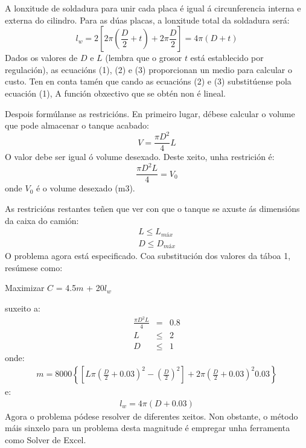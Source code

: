 \documentclass[
  letterpaper,
  DIV=11,
  numbers=noendperiod]{scrartcl}
\begin{document}
A lonxitude de soldadura para unir cada placa é igual á circunferencia
interna e externa do cilindro. Para as dúas placas, a lonxitude total da
soldadura será: \[
l_w = 2 \left [ 2 \pi \left ( \frac {D}{2} + t \right ) + 2 \pi \frac {D}{2} \right ] = 4 \pi (D + t)
\] Dados os valores de \(D\) e \(L\) (lembra que o grosor \(t\) está
establecido por regulación), as ecuacións (1), (2) e (3) proporcionan un
medio para calcular o custo. Ten en conta tamén que cando as ecuacións
(2) e (3) substitúense pola ecuación (1), A función obxectivo que se
obtén non é lineal.

Despois formúlanse as restricións. En primeiro lugar, débese calcular o
volume que pode almacenar o tanque acabado: \[
V = \frac {\pi D^2}{4} L
\] O valor debe ser igual ó volume desexado. Deste xeito, unha
restrición é: \[
\frac {\pi D^2 L}{4} = V_0
\] onde \(V_0\) é o volume desexado (m3).

As restricións restantes teñen que ver con que o tanque se axuste ás
dimensións da caixa do camión: \[
\begin{align*}
L \leq L_{máx} \\
D \leq D_{máx}
\end{align*}
\] O problema agora está especificado. Coa substitución dos valores da
táboa 1, resúmese como:

Maximizar \(C\) = 4.5\(m\) + 20\(l_w\)

suxeito a: \[
\begin{align*}
\frac {\pi D^2 L}{4} & = & 0.8 \\
L & \leq & 2 \\
D & \leq & 1
\end{align*}
\] onde: \[
\begin{align*}
m = 8000 \left\{ \left [ L \pi {\left ( \frac {D}{2} + 0.03 \right)}^2 - {\left ( \frac {D}{2} \right )}^2 \right] + 2 \pi {\left ( \frac {D}{2} + 0.03 \right )}^2 0.03 \right\}
\end{align*}
\] e: \[
\begin{align*}
l_w = 4 \pi (D + 0.03)
\end{align*}
\] Agora o problema pódese resolver de diferentes xeitos. Non obstante,
o método máis sinxelo para un problema desta magnitude é empregar unha
ferramenta como Solver de Excel.
\end{document}

